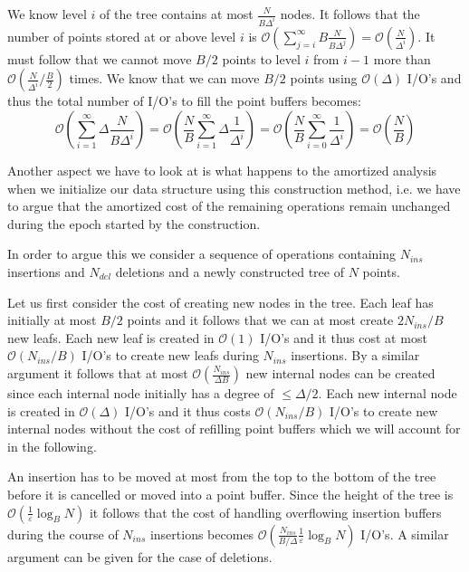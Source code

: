 \documentclass[twoside,11pt,openright]{report}
\def \epsilon {\varepsilon}
\begin{document}
We know level $i$ of the tree contains at most $\frac{N}{B\Delta^i}$ nodes. It follows that the number of points stored at or above level $i$ is $\mathcal{O}\left(\sum_{j=i}^\infty B\frac{N}{B\Delta^j}\right) = \mathcal{O}\left(\frac{N}{\Delta^i}\right)$. It must follow that we cannot move $B/2$ points to level $i$ from $i-1$ more than $\mathcal{O}\left(\frac{N}{\Delta^i} / \frac{B}{2}\right)$ times. We know that we can move $B/2$ points using $\mathcal{O}(\Delta)$ I/O's and thus the total number of I/O's to fill the point buffers becomes:
$$\mathcal{O}\left(\sum\limits_{i=1}^\infty \Delta \frac{N}{B\Delta^i}\right) = \mathcal{O}\left(\frac{N}{B}\sum\limits_{i=1}^\infty \Delta \frac{1}{\Delta^i}\right) = \mathcal{O}\left(\frac{N}{B}\sum\limits_{i=0}^\infty \frac{1}{\Delta^i}\right) = \mathcal{O}\left(\frac{N}{B}\right)$$

Another aspect we have to look at is what happens to the amortized analysis when we initialize our data structure using this construction method, i.e. we have to argue that the amortized cost of the remaining operations remain unchanged during the epoch started by the construction.

In order to argue this we consider a sequence of operations containing $N_{ins}$ insertions and $N_{del}$ deletions and a newly constructed tree of $N$ points.

Let us first consider the cost of creating new nodes in the tree. Each leaf has initially at most $B/2$ points and it follows that we can at most create $2N_{ins}/B$ new leafs. Each new leaf is created in $\mathcal{O}(1)$ I/O's and it thus cost at most $\mathcal{O}(N_{ins}/B)$ I/O's to create new leafs during $N_{ins}$ insertions.
By a similar argument it follows that at most $\mathcal{O}\left(\frac{N_{ins}}{\Delta B}\right)$ new internal nodes can be created since each internal node initially has a degree of $\leq \Delta/2$. Each new internal node is created in $\mathcal{O}(\Delta)$ I/O's and it thus costs $\mathcal{O}(N_{ins}/B)$ I/O's to create new internal nodes without the cost of refilling point buffers which we will account for in the following.

An insertion has to be moved at most from the top to the bottom of the tree before it is cancelled or moved into a point buffer. Since the height of the tree is $\mathcal{O}\left(\frac{1}{\epsilon} \log_B N\right)$ it follows that the cost of handling overflowing insertion buffers during the course of $N_{ins}$ insertions becomes $\mathcal{O}\left(\frac{N_{ins}}{B/\Delta}\frac{1}{\epsilon}\log_B N\right)$ I/O's.
A similar argument can be given for the case of deletions.
\end{document}
